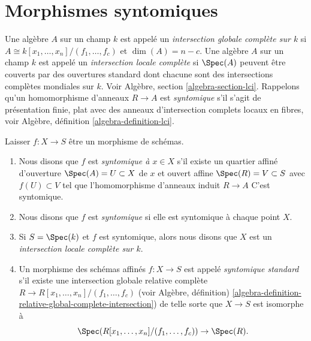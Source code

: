 \section{Morphismes syntomiques}
\label{section-syntomic}

\noindent

Une algèbre $A$ sur un champ $k$ est appelé un {\it intersection globale complète sur $k$} si $A \cong k[x_1, \ldots, x_n]/(f_1, \ldots, f_c)$ et
$\dim(A) = n - c$. Une algèbre $A$ sur un champ $k$ est appelé un {\it intersection locale complète} si $\Spec(A)$
peuvent être couverts par des ouvertures standard dont chacune sont des intersections complètes mondiales sur $k$. Voir Algèbre, section
\ref{algebra-section-lci}. Rappelons qu'un homomorphisme d'anneaux $R \to A$
est {\it syntomique} s'il s'agit de présentation finie, plat avec des anneaux d'intersection complets locaux en fibres, voir Algèbre, définition \ref{algebra-definition-lci}.

\begin{definition}

\label{definition-syntomic}

Laisser $f : X \to S$ être un morphisme de schémas.

\begin{enumerate}

\item Nous disons que $f$ est {\it syntomique à $x \in X$} s'il existe un quartier affiné d'ouverture $\Spec(A) = U \subset X$
de $x$ et ouvert affine $\Spec(R) = V \subset S$
avec $f(U) \subset V$ tel que l'homomorphisme d'anneaux induit
$R \to A$ C'est syntomique.
\item Nous disons que $f$ est {\it syntomique} si elle est syntomique à chaque point $X$.
\item Si $S = \Spec(k)$ et $f$ est syntomique, alors nous disons que
$X$ est un {\it intersection locale complète sur $k$}.
\item Un morphisme des schémas affinés $f : X \to S$
est appelé {\it syntomique standard} s'il existe une intersection globale relative complète
$R \to R[x_1, \ldots, x_n]/(f_1, \ldots, f_c)$ (voir Algèbre, définition) \ref{algebra-definition-relative-global-complete-intersection}) de telle sorte que $X \to S$ est isomorphe à
$$
\Spec(R[x_1, \ldots, x_n]/(f_1, \ldots, f_c)) \to \Spec(R).
$$

\end{enumerate}

\end{definition}

